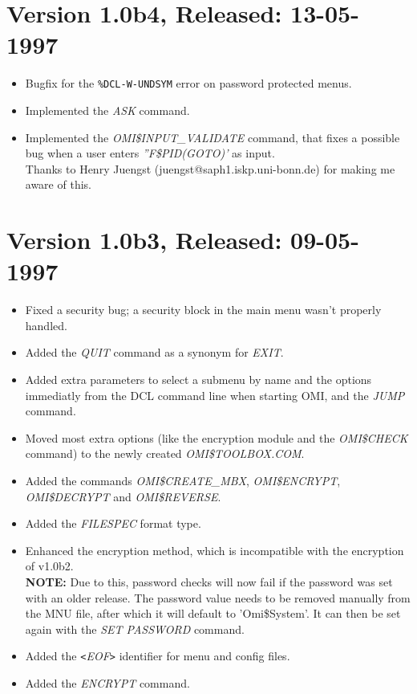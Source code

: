 \documentclass[a4paper]{book}
\newcommand{\lt}{\texttt{<}}
\newcommand{\gt}{\texttt{>}}
\begin{document}
\section*{Version 1.0b4, Released: 13-05-1997}

\begin{itemize}
\item Bugfix for the \texttt{\%DCL-W-UNDSYM} error on password protected menus.
\item Implemented the \textsl{ASK} command.
\item Implemented the \textsl{OMI{\$}INPUT{\_}VALIDATE} command, that fixes a possible bug when a user enters \textsl{''F{\$}PID(GOTO)'} as input.\\
Thanks to Henry Juengst (juengst@saph1.iskp.uni-bonn.de) for making me aware of this.
\end{itemize}

\section*{Version 1.0b3, Released: 09-05-1997}

\begin{itemize}
\item Fixed a security bug; a security block in the main menu wasn't properly handled.
\item Added the \textsl{QUIT} command as a synonym for \textsl{EXIT}.
\item Added extra parameters to select a submenu by name and the options immediatly from the DCL command line when starting OMI, and the \textsl{JUMP} command.
\item Moved most extra options (like the encryption module and the \textsl{OMI{\$}CHECK} command) to the newly created \textsl{OMI{\$}TOOLBOX.COM}.
\item Added the commands \textsl{OMI{\$}CREATE{\_}MBX}, \textsl{OMI{\$}ENCRYPT}, \textsl{OMI{\$}DECRYPT} and \textsl{OMI{\$}REVERSE}.
\item Added the \textsl{FILESPEC} format type.
\item Enhanced the encryption method, which is incompatible with the encryption of v1.0b2.\\
\textbf{NOTE:} Due to this, password checks will now fail if the password was set with an older release. The password value needs to be removed manually from the MNU file, after which it will default to 'Omi{\$}System'. It can then be set again with the \textsl{SET PASSWORD} command.
\item Added the \textsl{\lt EOF\gt} identifier for menu and config files.
\item Added the \textsl{ENCRYPT} command.
\end{itemize}
\end{document}
